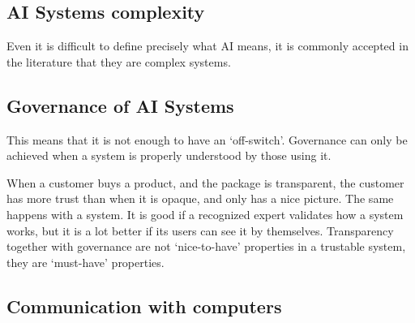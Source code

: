 
\subsection{AI Systems complexity}

Even it is difficult to define precisely what AI means, it is commonly accepted in the literature that they are complex systems.

\subsection{Governance of AI Systems}

This means that it is not enough to have an `off-switch'.
Governance can only be achieved when a system is properly understood by those using it.

When a customer buys a product, and the package is transparent, the customer has more trust than when it is opaque, and only has a nice picture.
The same happens with a system.
It is good if a recognized expert validates how a system works, but it is a lot better if its users can see it by themselves.
Transparency together with governance are not `nice-to-have' properties in a trustable system, they are `must-have' properties.

\subsection{Communication with computers}

